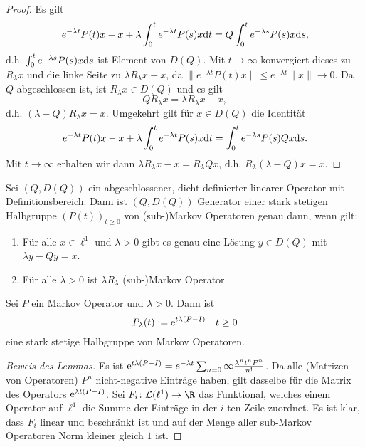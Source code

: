 \begin{proof}
Es gilt $$e^{-\lambda t}P(t)x-x+\lambda\int_0^t e^{-\lambda t}P(s)x\text dt=Q\int_0^t e^{-\lambda s}P(s)x\text ds,$$ d.h. $\int_0^t e^{-\lambda s}P(s)x\text ds$ ist Element von $D(Q)$. Mit $t\to \infty$ konvergiert dieses zu $R_\lambda x$ und die linke Seite zu $\lambda R_\lambda x-x$, da $\|e^{-\lambda t}P(t)x\|\leq e^{-\lambda t}\|x\|\to 0$. Da $Q$ abgeschlossen ist, ist $R_\lambda x\in D(Q)$ und es gilt $$QR_\lambda x=\lambda R_\lambda x-x,$$ d.h. $(\lambda - Q)R_\lambda x=x$. Umgekehrt gilt  für $x\in D(Q)$ die Identität $$e^{-\lambda t}P(t)x-x+\lambda \int_0^t e^{-\lambda t}P(s)x\text dt=\int_0^t e^{-\lambda s}P(s)Qx\text ds.$$ Mit $t\to\infty$ erhalten wir dann $\lambda R_\lambda x-x=R_\lambda Qx$, d.h. $R_\lambda (\lambda -Q)x=x$. 
\end{proof}


\begin{satz}
  Sei $(Q, D(Q))$ ein abgeschlossener, dicht definierter linearer Operator mit Definitionsbereich. Dann ist $(Q,D(Q))$   Generator einer stark stetigen Halbgruppe $(P(t))_{t\geq0}$ von (sub-)Markov Operatoren genau dann, wenn gilt:
  \begin{enumerate}
      \item Für alle $x\in \ell^1$ und $\lambda>0$ gibt es genau eine Lösung $y\in D(Q)$ mit $\lambda y- Qy = x$. 
      \item Für alle $\lambda>0$ ist  $\lambda R_\lambda$  (sub-)Markov Operator. 
  \end{enumerate}
\end{satz}


\begin{lem}
  Sei $P$ ein Markov Operator und $\lambda > 0$. Dann  ist $$P_\lambda(t):=\textnormal  e^{t\lambda(P-I)}\quad t\geq0$$ eine stark stetige Halbgruppe von Markov Operatoren.
\end{lem}

\begin{proof}[Beweis des Lemmas]
  Es ist $\text e^{t\lambda (P-I)}=e^{-\lambda t}\sum_{n=0}\infty\frac{\lambda^n t^n P^n}{n!}$. Da alle (Matrizen von Operatoren) $P^n$ nicht-negative Einträge haben, gilt dasselbe für die Matrix des Operators $\text e^{\lambda t(P-I)}$.  Sei $F_i\colon \mathcal L(\ell^1)\to \R$ das Funktional, welches  einem Operator auf $\ell^1$ die Summe der Einträge in der $i$-ten Zeile zuordnet. Es ist klar, dass $F_i$ linear und beschränkt ist und auf der Menge aller sub-Markov Operatoren Norm kleiner gleich $1$ ist.
\end{proof}

